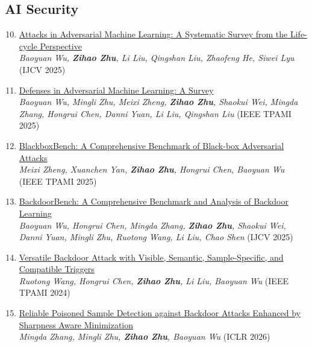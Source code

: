 \documentclass[11pt,a4paper,sans]{moderncv}
\newcommand{\darkred}[1]{\textcolor{harvardcrimson}{#1}}
\newcommand{\paperlink}[2]{\hypersetup{urlcolor=black}\href{#1}{#2}\hypersetup{urlcolor=blue}}
\begin{document}
\subsection{AI Security}
    \begin{enumerate}[itemsep=2pt, topsep=2pt, parsep=0pt]
    \setcounter{enumi}{9}
    \item \paperlink{https://arxiv.org/pdf/2302.09457}{Attacks in Adversarial Machine Learning: A Systematic Survey from the Life-cycle Perspective}\\
    \textit{Baoyuan Wu, \textbf{Zihao Zhu}, Li Liu, Qingshan Liu, Zhaofeng He, Siwei Lyu} \darkred{(IJCV 2025)}
    
    \item \paperlink{https://arxiv.org/pdf/2312.08890}{Defenses in Adversarial Machine Learning: A Survey}\\
    \textit{Baoyuan Wu, Mingli Zhu, Meixi Zheng, \textbf{Zihao Zhu}, Shaokui Wei, Mingda Zhang, Hongrui Chen, Danni Yuan, Li Liu, Qingshan Liu} \darkred{(IEEE TPAMI 2025)}
    
    \item \paperlink{https://arxiv.org/pdf/2312.16979}{BlackboxBench: A Comprehensive Benchmark of Black-box Adversarial Attacks}\\
    \textit{Meixi Zheng, Xuanchen Yan, \textbf{Zihao Zhu}, Hongrui Chen, Baoyuan Wu} \darkred{(IEEE TPAMI 2025)}
    
    \item \paperlink{https://arxiv.org/abs/2401.15002}{BackdoorBench: A Comprehensive Benchmark and Analysis of Backdoor Learning}\\
    \textit{Baoyuan Wu, Hongrui Chen, Mingda Zhang, \textbf{Zihao Zhu}, Shaokui Wei, Danni Yuan, Mingli Zhu, Ruotong Wang, Li Liu, Chao Shen} \darkred{(IJCV 2025)}
    
    \item \paperlink{https://arxiv.org/pdf/2306.00816}{Versatile Backdoor Attack with Visible, Semantic, Sample-Specific, and Compatible Triggers}\\
    \textit{Ruotong Wang, Hongrui Chen, \textbf{Zihao Zhu}, Li Liu, Baoyuan Wu} \darkred{(IEEE TPAMI 2024)}
    
    \item \paperlink{https://arxiv.org/pdf/2411.11525}{Reliable Poisoned Sample Detection against Backdoor Attacks Enhanced by Sharpness Aware Minimization}\\
    \textit{Mingda Zhang, Mingli Zhu, \textbf{Zihao Zhu}, Baoyuan Wu} \darkred{(ICLR 2026)}
    

\end{enumerate}
\end{document}
